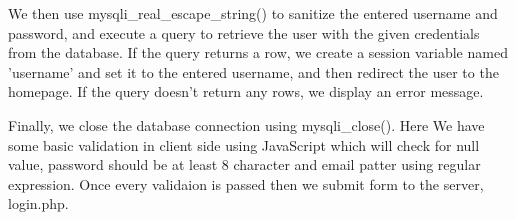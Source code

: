 \documentclass[11pt]{article}
\begin{document}
We then use mysqli\_real\_escape\_string() to sanitize the entered username and password, and execute a query to retrieve the user with the given credentials from the database. If the query returns a row, we create a session variable named 'username' and set it to the entered username, and then redirect the user to the homepage. If the query doesn't return any rows, we display an error message.

Finally, we close the database connection using mysqli\_close().
Here We have some basic validation in client side using JavaScript which will check for null value, password should be at least 8 character and email patter using regular expression. Once every validaion is passed then we submit form to the server, login.php. 

\end{document}
